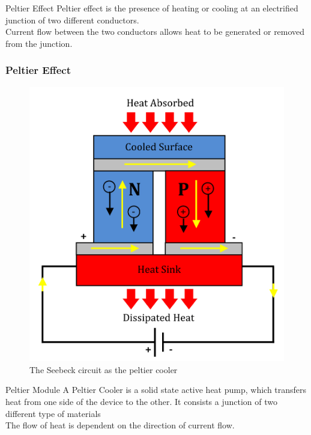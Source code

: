 \documentclass[10pt]{beamer}
\begin{document}
{
	\begin{frame}{Peltier Effect}
		Peltier effect is the presence of heating or cooling at an electrified junction of two different conductors. \\
		\vspace{5mm}
		Current flow between the two conductors allows heat to be generated or removed from the junction.
	\end{frame}
}
{
	\begin{frame}
		\frametitle{Peltier Effect}
		\begin{figure}
			\includegraphics[scale=1.4]{images/peltier_effect}
			\caption{The Seebeck circuit as the peltier cooler}
		\end{figure}
	\end{frame}
}
{
\begin{frame}{Peltier Module}
	A Peltier Cooler is a solid state active heat pump, which transfers heat from one side of the device to the other. It consists a junction of two different type of materials\\
	\vspace{5mm}
	The flow of heat is dependent on the direction of current flow.
\end{frame}
}
\end{document}
